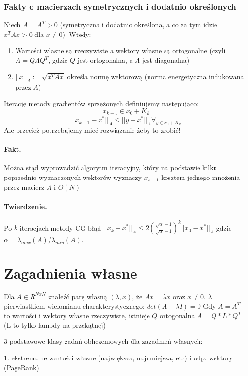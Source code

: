 \documentclass{article}
\begin{document}
\subsubsection{Fakty o macierzach symetrycznych i dodatnio określonych}

Niech $A = A^T>0$ (symetryczna i dodatnio określona, a co za tym idzie $x^TAx>0\text{ dla }x\not=0$). Wtedy:
\begin{enumerate}
	\item Wartości własne są rzeczywiste a wektory własne są ortogonalne (czyli $ A=Q\Lambda Q^T $, gdzie $ Q $ jest ortogonalna, a $ \Lambda $ jest diagonalna)
	\item $ ||x||_A:=\sqrt{x^TAx} $ określa normę wektorową (norma energetyczna indukowana przez $ A $)
\end{enumerate}
Iterację metody gradientów sprzężonych definiujemy następująco:
$$ x_{k+1}\in x_0 + K_k $$
$$ ||x_{k+1}-x^*||_A\leq ||y-x^*||_A\forall_{y\in x_0+K_k} $$
Ale przecież potrzebujemy mieć rozwiązanie żeby to zrobić!
\paragraph{Fakt.} Można stąd wyprowadzić algorytm iteracyjny, który na podstawie kilku poprzednio wyznaczonych wektorów wyznaczy $ x_{k+1} $ kosztem jednego mnożenia przez macierz $ A $ i $ O(N) $
\paragraph{Twierdzenie.} Po $ k $ iteracjach metody CG błąd $ ||x_k-x^*||_A \leq 2(\frac{\sqrt{\alpha}-1}{\sqrt{\alpha}+1})^k ||x_0-x^*||_A $
gdzie $ \alpha = \lambda_{max}(A)/\lambda_{min}(A) $.

\section{Zagadnienia własne}

Dla $ A \in R^{NxN} $ znaleźć parę własną $ (\lambda, x)$, że $Ax = \lambda x$ oraz $x \neq 0$.
$\lambda$ pierwiastkiem wielomianu charakterystycznego: $det(A - \lambda I) = 0$
Gdy $A = A^T$ to wartości i wektory własne rzeczywiste, istnieje $Q$ ortogonalna $A = Q*L*Q^T$ (L to tylko lambdy na przekątnej)


3 podstawowe klasy zadań obliczeniowych dla zagadnień własnych:

1. ekstremalne wartości własne (największa, najmniejsza, etc) i odp. wektory (PageRank)
\end{document}
